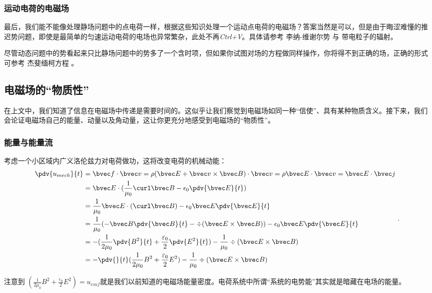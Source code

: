 \subsubsection{运动电荷的电磁场}
最后，我们能不能像处理静场问题中的点电荷一样，根据这些知识处理一个运动点电荷的电磁场？答案当然是可以，但是由于晦涩难懂的推迟势问题，即使是最简单的匀速运动电荷的电场也异常繁杂，此处不再\textsl{Ctrl+V}。具体请参考 李纳-维谢尔势 与 带电粒子的辐射。

尽管动态问题中的势看起来只比静场问题中的势多了一个含时项，但如果你试图对场的方程做同样操作，你将得不到正确的场，正确的形式可参考 杰斐缅柯方程 \cite{GriffE}。

\subsection{电磁场的“物质性”}
在上文中，我们知道了信息在电磁场中传递是需要时间的。这似乎让我们察觉到电磁场如同一种“信使”、具有某种物质含义。接下来，我们会论证电磁场自己的能量、动量以及角动量，这让你更充分地感受到电磁场的“物质性”。

\subsubsection{能量与能量流} 
考虑一个小区域内广义洛伦兹力对电荷做功，这将改变电荷的机械动能：
$$
\begin{aligned}
\pdv{u_{mech}}{t} &= \bvec f \cdot \bvec v = \rho (\bvec E + \bvec v \times \bvec B)\cdot \bvec v = \rho \bvec E \cdot \bvec v = \bvec E \cdot \bvec j \\
 & = \bvec E \cdot (\frac{1}{\mu_0} \curl \bvec B - \epsilon_0 \pdv{\bvec E}{t})\\
 & = \frac{1}{\mu_0} \bvec E \cdot (\curl \bvec B) - \epsilon_0 \bvec E \pdv{\bvec E}{t}\\
 & = \frac{1}{\mu_0} (-\bvec B \pdv{\bvec B}{t} - \div(\bvec E \times \bvec B))- \epsilon_0 \bvec E \pdv{\bvec E}{t}\\
 & = - (\frac{1}{2\mu_0} \pdv{B^2}{t} + \frac{\varepsilon_0}{2} \pdv{E^2}{t}) - \frac{1}{\mu_0} \div(\bvec E \times \bvec B)\\
 & = - \pdv{}{t} (\frac{1}{2\mu_0} B^2 + \frac{\varepsilon_0}{2} E^2) - \frac{1}{\mu_0} \div(\bvec E \times \bvec B)
\end{aligned}
~.
$$

注意到 $(\frac{1}{2\mu_0} B^2 + \frac{\varepsilon_0}{2} E^2) = u_{emf}$就是我们以前知道的电磁场能量密度。电荷系统中所谓“系统的电势能”其实就是暗藏在电场的能量。

